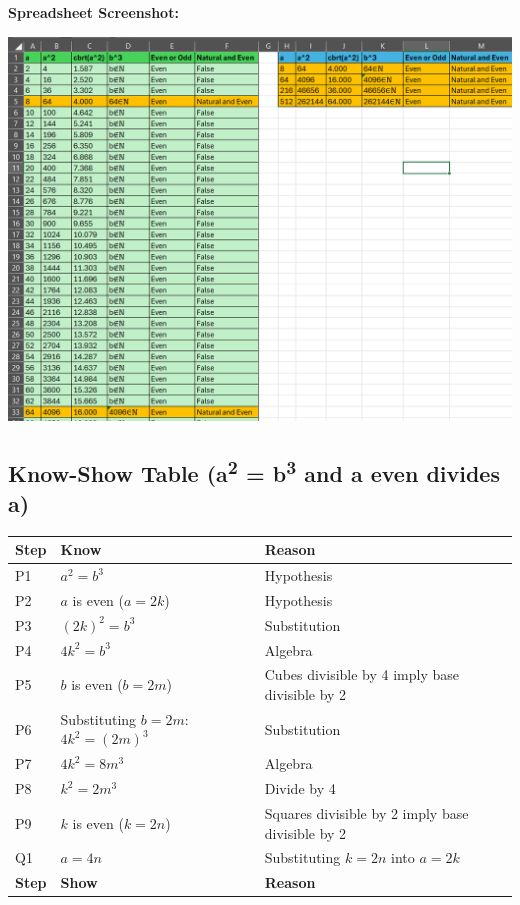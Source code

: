\textbf{Spreadsheet Screenshot:}
\begin{center}
    \includegraphics[width=\textwidth]{s.png}

\end{center}

\newpage

\subsection{Know-Show Table (a\textsuperscript{2} = b\textsuperscript{3} and a even  divides a)}

\begin{center}
    \begin{tabular}{|p{}|p{}|p{}|}
    \hline
    \textbf{Step} & \textbf{Know} & \textbf{Reason} \\
    \hline
        P1 & \( a^2 = b^3 \) & Hypothesis \\
    \hline
        P2 & \( a \) is even (\( a = 2k \)) & Hypothesis \\
    \hline
        P3 & \( (2k)^2 = b^3 \) & Substitution \\
    \hline
        P4 & \( 4k^2 = b^3 \) & Algebra \\
    \hline
        P5 & \( b \) is even (\( b = 2m \)) & Cubes divisible by 4 imply base divisible by 2 \\
    \hline
        P6 & Substituting \( b = 2m \): \( 4k^2 = (2m)^3 \) & Substitution \\
    \hline
        P7 & \( 4k^2 = 8m^3 \) & Algebra \\
    \hline
        P8 & \( k^2 = 2m^3 \) & Divide by 4 \\
    \hline
        P9 & \( k \) is even (\( k = 2n \)) & Squares divisible by 2 imply base divisible by 2 \\
    \hline
        Q1 & \( a = 4n \) & Substituting \( k = 2n \) into \( a = 2k \) \\
    \hline
    \textbf{Step} & \textbf{Show} & \textbf{Reason} \\
    \hline
    \end{tabular}
\end{center}


